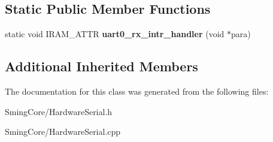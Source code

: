 \subsection*{Static Public Member Functions}
\begin{DoxyCompactItemize}
\item 
\hypertarget{class_hardware_serial_a71a922d109d82c8e2a657641623ee255}{}static void I\+R\+A\+M\+\_\+\+A\+T\+T\+R {\bfseries uart0\+\_\+rx\+\_\+intr\+\_\+handler} (void $\ast$para)\label{class_hardware_serial_a71a922d109d82c8e2a657641623ee255}

\end{DoxyCompactItemize}
\subsection*{Additional Inherited Members}


The documentation for this class was generated from the following files\+:\begin{DoxyCompactItemize}
\item 
Sming\+Core/Hardware\+Serial.\+h\item 
Sming\+Core/Hardware\+Serial.\+cpp\end{DoxyCompactItemize}
